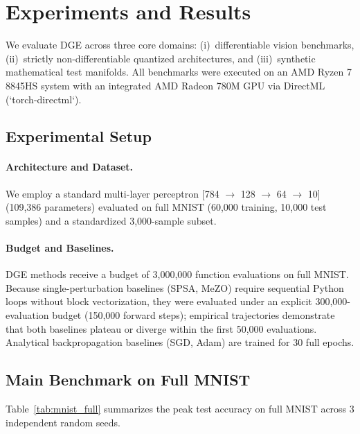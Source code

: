 \documentclass[11pt,a4paper]{article}
\begin{document}
\section{Experiments and Results}
\label{sec:experiments}

We evaluate DGE across three core domains: (i)~differentiable vision benchmarks, (ii)~strictly non-differentiable quantized architectures, and (iii)~synthetic mathematical test manifolds. All benchmarks were executed on an AMD Ryzen 7 8845HS system with an integrated AMD Radeon 780M GPU via DirectML (`torch-directml`).

\subsection{Experimental Setup}

\paragraph{Architecture and Dataset.} We employ a standard multi-layer perceptron [784 $\to$ 128 $\to$ 64 $\to$ 10] (109,386 parameters) evaluated on full MNIST (60,000 training, 10,000 test samples) and a standardized 3,000-sample subset.
\paragraph{Budget and Baselines.} DGE methods receive a budget of 3,000,000 function evaluations on full MNIST. Because single-perturbation baselines (SPSA, MeZO) require sequential Python loops without block vectorization, they were evaluated under an explicit 300,000-evaluation budget (150,000 forward steps); empirical trajectories demonstrate that both baselines plateau or diverge within the first 50,000 evaluations. Analytical backpropagation baselines (SGD, Adam) are trained for 30 full epochs.

\subsection{Main Benchmark on Full MNIST}
\label{sec:mnist_results}

Table~\ref{tab:mnist_full} summarizes the peak test accuracy on full MNIST across 3 independent random seeds.
\end{document}
